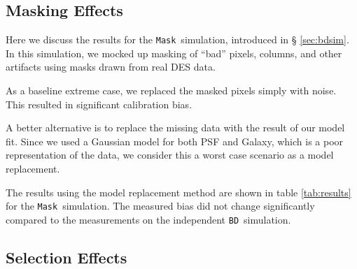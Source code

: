 \documentclass[usegraphicx,usenatbib]{mn2e}
\newcommand{\mcal}{metacalibration}
\newcommand{\mcalR}{$R$}
\newcommand{\bdsim}{\texttt{BD}}
\newcommand{\bdmask}{\texttt{Mask}}
\begin{document}

\subsection{Masking Effects} \label{sec:masking}

Here we discuss the results for the \bdmask\ simulation, introduced in \S
\ref{sec:bdsim}.  In this simulation, we mocked up masking of ``bad'' pixels,
columns, and other artifacts using masks drawn from real DES data.

As a baseline extreme case, we replaced the masked pixels simply with noise.
This resulted in significant calibration bias.


A better alternative is to replace the missing data with the result of our
model fit.  Since we used a Gaussian model for both PSF and Galaxy, which is a
poor representation of the data, we consider this a worst case scenario as a
model replacement. 

The results using the model replacement method are shown in table
\ref{tab:results} for the \bdmask\ simulation.  The measured bias did not
change significantly compared to the measurements on the independent \bdsim\
simulation.

\subsection{Selection Effects} \label{sec:selection}
\end{document}
